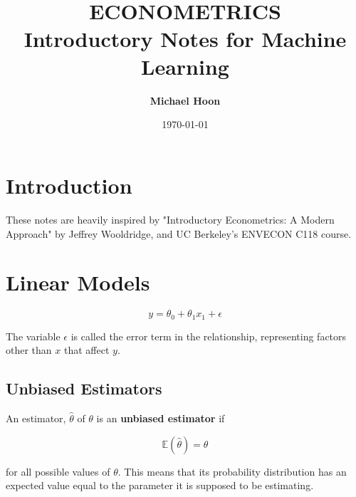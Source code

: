 \documentclass{article}
\begin{document}

\title{ \normalsize \textsc{}
		\\ [2.0cm]
		\HRule{1.5pt} \\
		\LARGE \textbf{\uppercase{Econometrics}
		\HRule{2.0pt} \\ [0.6cm] \LARGE{Introductory Notes for Machine Learning} \vspace*{10\baselineskip}}
		}
\date{\today}
\author{\textbf{Michael Hoon}}

\maketitle
\newpage

\tableofcontents
\newpage



\section{Introduction}
These notes are heavily inspired by "Introductory Econometrics: A Modern Approach" by Jeffrey Wooldridge, and UC Berkeley's ENVECON C118 course. 

\section{Linear Models}

\begin{equation}
    y = \theta_0 + \theta_1 x_{1} + \epsilon
\end{equation}

\noindent The variable $\epsilon$ is called the error term in the relationship, representing factors other than $x$ that affect $y$. 

\subsection{Unbiased Estimators}
An estimator, $\hat{\theta}$ of $\theta$ is an \textbf{unbiased estimator} if 

\begin{equation}
    \mathbb{E}(\hat{\theta}) = \theta
\end{equation}

\noindent for all possible values of $\theta$. This means that its probability distribution has an expected value equal to the parameter it is supposed to be estimating. 
\end{document}
